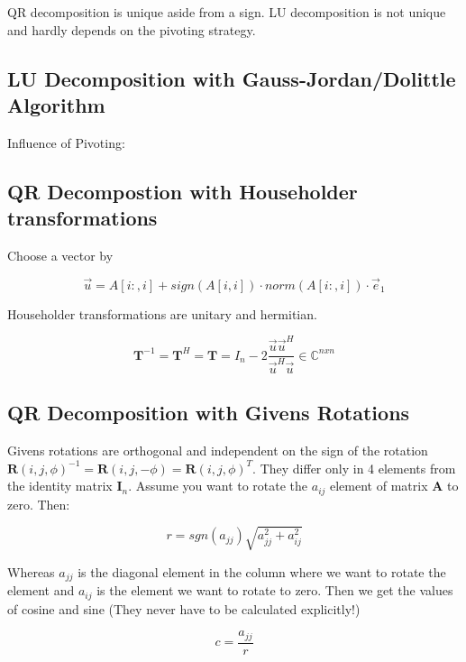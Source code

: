 \documentclass[
    a4paper,
    11pt
]{article}
\begin{document}
QR decomposition is unique aside from a sign.
LU decomposition is not unique and hardly depends on the pivoting strategy.

\subsection{LU Decomposition with Gauss-Jordan/Dolittle Algorithm}

Influence of Pivoting:

\subsection{QR Decompostion with Householder transformations}

Choose a vector by

\begin{equation}
    \vec{u} = A[i:, i] + sign(A[i,i]) \cdot norm(A[i:, i]) \cdot \vec{e}_1
\end{equation}


Householder transformations are unitary and hermitian.

\begin{equation}
    \mathbf{T}^{-1} = \mathbf{T}^H = \mathbf{T} = I_n - 2
    \frac{\vec{u}\vec{u}^H}{\vec{u}^H\vec{u}} \in \mathbb{C}^{n x n}
\end{equation}

\subsection{QR Decomposition with Givens Rotations}

Givens rotations are orthogonal and independent on the sign of the
rotation $\mathbf{R}(i,j,\phi)^{-1} = \mathbf{R}(i,j, -\phi) = \mathbf{R}(i,j,
\phi)^{T}$. They differ only in 4 elements from the identity matrix
$\mathbf{I}_n$. Assume you want to rotate the $a_{ij}$ element of matrix
$\mathbf{A}$ to zero. Then:

\begin{equation}
    r = sgn(a_{jj}) \sqrt{a_{jj}^2 + a_{ij}^2}
\end{equation}

Whereas $a_{jj}$ is the diagonal element in the column where we want to rotate
the element and $a_{ij}$ is the element we want to rotate to zero. Then we get
the values of cosine and sine (They never have to be calculated explicitly!)

\begin{equation}
    c = \frac{a_{jj}}{r}
\end{equation}
\end{document}
